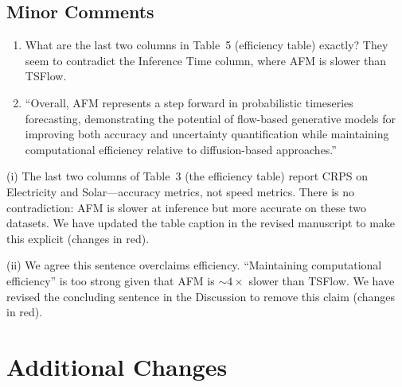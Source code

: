 \documentclass[11pt]{article}
\newcommand{\reviewertext}[1]{%
  \begin{reviewerquote}
    {\color{reviewercolor}\itshape #1}
  \end{reviewerquote}%
}
\newcommand{\authorresponse}[1]{%
    #1\par\medskip
}
\begin{document}
\subsection{Minor Comments}

\reviewertext{%
\begin{enumerate}[nosep]
  \item What are the last two columns in Table~5 (efficiency table) exactly? They seem to contradict the Inference Time column, where AFM is slower than TSFlow.
  \item ``Overall, AFM represents a step forward in probabilistic timeseries forecasting, demonstrating the potential of flow-based generative models for improving both accuracy and uncertainty quantification while maintaining computational efficiency relative to diffusion-based approaches.''
\end{enumerate}
}

\authorresponse{%
(i) The last two columns of Table~3 (the efficiency table) report CRPS on Electricity and Solar---accuracy metrics, not speed metrics. There is no contradiction: AFM is slower at inference but more accurate on these two datasets. We have updated the table caption in the revised manuscript to make this explicit (changes in red).

(ii) We agree this sentence overclaims efficiency. ``Maintaining computational efficiency'' is too strong given that AFM is ${\sim}4\times$ slower than TSFlow. We have revised the concluding sentence in the Discussion to remove this claim (changes in red).
}

\section{Additional Changes}
\end{document}
